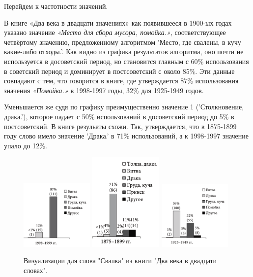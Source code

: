 Перейдем к частотности значений.

В книге «Два века в двадцати значениях» как появившееся в 1900-ых годах указано
значение \textit{«Место для сбора мусора, помойка.»}, соответствующее четвёртому значению,
предложенному алгоритмом ’Место, где свалены, в кучу какие-либо отходы.’.
Как видно из графика результатов алгоритма, оно почти не используется в досоветский период,
но становится главным
с 60\% использования в советский период и доминирует в постсоветский с около 85\%.
Эти данные совпадают с тем, что говорится в книге, где утверждается 87\% использования
значения \textit{«Помойка.»} в 1998-1997 годы, 32\% для 1925-1949 годов.

Уменьшается же судя по графику преимущественно значение 1 (’Столкновение, драка.’),
которое падает с 50\% использований в досоветский период до 5\% в постсоветский.
В книге резульаты схожи.
Так, утверждается, что в 1875-1899 году слово имело значение ’Драка.’
в 71\% использований,
а к 1998-1997 значение упало до 12\%.

\noindent %
\begin{figure}[H]
    \centering %
    \includegraphics[width=0.32\textwidth]{img/book/Свалка 1998-1999}
    \hfill %
    \includegraphics[width=0.32\textwidth]{img/book/Свалка 1875-1799}
    \hfill %
    \includegraphics[width=0.32\textwidth]{img/book/Свалка 1925-1949}
    \caption{Визуализации для слова "Свалка" из книги "Два века в двадцати словах".}
\end{figure}

